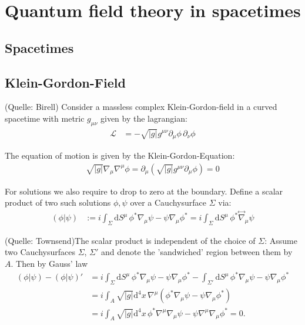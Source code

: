 \chapter{Quantum field theory in spacetimes}
\section{Spacetimes}

\section{Klein-Gordon-Field}
(Quelle: Birell)
Consider a massless complex Klein-Gordon-field in a curved spacetime with metric \(g_{\mu\nu}\) given by the lagrangian:
\begin{align}
\mathcal{L} &= -\sqrt{|g|} g^{\mu\nu} \partial_\mu \phi\,\partial_\nu \phi 
\end{align}

The equation of motion is given by the Klein-Gordon-Equation:
\begin{align}
\sqrt{|g|}\nabla_\mu\nabla^\mu \phi = \partial_\mu \left(\sqrt{|g|} g^{\mu\nu} \partial_\mu \phi\right) = 0
\end{align}

For solutions we also require to drop to zero at the boundary. Define a scalar product of two such solutions $\phi, \psi$ over a Cauchysurface \(\Sigma\) via:
\begin{align}
(\phi|\psi) &:= i \int_{\Sigma} \mathrm{d}S^\mu\, \phi^*\nabla_\mu \psi - \psi\nabla_\mu \phi^* = i \int_{\Sigma} \mathrm{d}S^\mu\, \phi^*\overset{\leftrightarrow}{\nabla}_\mu \psi
\end{align}

(Quelle: Townsend)The scalar product is independent of the choice of \(\Sigma\): Assume two Cauchysurfaces \(\Sigma\), \(\Sigma'\) and denote the 'sandwiched' region between them by \(A\). Then by Gauss' law
\begin{align}
(\phi|\psi) - (\phi|\psi)' &= i\int_{\Sigma}\mathrm{d}S^\mu\, \phi^*\nabla_\mu \psi - \psi\nabla_\mu \phi^* - \int_{\Sigma'}\mathrm{d}S^\mu\, \phi^*\nabla_\mu \psi - \psi\nabla_\mu \phi^*\\
	&= i\int_{A} \sqrt{|g|} \mathrm{d^4}x\,\nabla^\mu \left(\phi^*\nabla_\mu \psi - \psi\nabla_\mu \phi^*\right)\\
	&= i\int_{A} \sqrt{|g|} \mathrm{d^4}x\,\phi^*\nabla^\mu\nabla_\mu \psi - \psi \nabla^\mu\nabla_\mu\phi^* = 0.
\label{equ:qft_scalarproduct_invariant}
\end{align}

